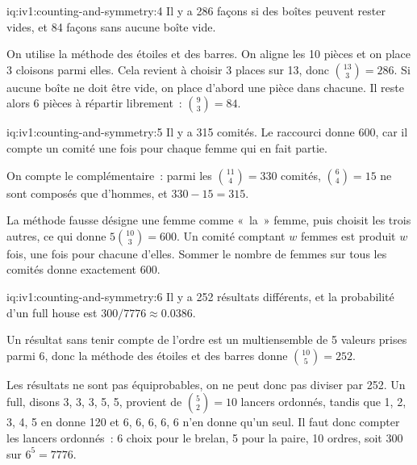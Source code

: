 \begin{solution}{iq:iv1:counting-and-symmetry:4}
Il y a 286 façons si des boîtes peuvent rester vides, et 84 façons sans aucune boîte vide.

On utilise la méthode des étoiles et des barres. On aligne les 10 pièces et on place 3 cloisons parmi elles. Cela revient à choisir 3 places sur 13, donc $\binom{13}{3} = 286$. Si aucune boîte ne doit être vide, on place d'abord une pièce dans chacune. Il reste alors 6 pièces à répartir librement~: $\binom{9}{3} = 84$.

\end{solution}

\begin{solution}{iq:iv1:counting-and-symmetry:5}
Il y a 315 comités. Le raccourci donne 600, car il compte un comité une fois pour chaque femme qui en fait partie.

On compte le complémentaire~: parmi les $\binom{11}{4} = 330$ comités, $\binom{6}{4} = 15$ ne sont composés que d'hommes, et $330 - 15 = 315$.

La méthode fausse désigne une femme comme «~la~» femme, puis choisit les trois autres, ce qui donne $5 \binom{10}{3} = 600$. Un comité comptant $w$ femmes est produit $w$ fois, une fois pour chacune d'elles. Sommer le nombre de femmes sur tous les comités donne exactement 600.

\end{solution}

\begin{solution}{iq:iv1:counting-and-symmetry:6}
Il y a 252 résultats différents, et la probabilité d'un full house est $300/7776 \approx 0.0386$.

Un résultat sans tenir compte de l'ordre est un multiensemble de 5 valeurs prises parmi 6, donc la méthode des étoiles et des barres donne $\binom{10}{5} = 252$.

Les résultats ne sont pas équiprobables, on ne peut donc pas diviser par 252. Un full, disons 3, 3, 3, 5, 5, provient de $\binom{5}{2} = 10$ lancers ordonnés, tandis que 1, 2, 3, 4, 5 en donne 120 et 6, 6, 6, 6, 6 n'en donne qu'un seul. Il faut donc compter les lancers ordonnés~: 6 choix pour le brelan, 5 pour la paire, 10 ordres, soit 300 sur $6^5 = 7776$.

\end{solution}

